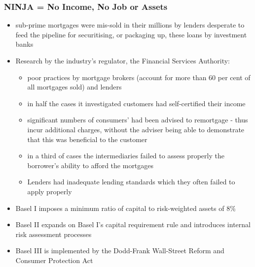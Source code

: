 \documentclass[11pt]{beamer}
\begin{document}
\begin{frame}
\frametitle{NINJA = No Income, No Job or Assets}
\begin{itemize}
\item sub-prime mortgages were mis-sold in their millions by lenders desperate to feed the pipeline for securitising, or packaging up, these loans by investment banks
\item Research by the industry's regulator, the Financial Services Authority:
\begin{itemize}
\item poor practices by mortgage brokers (account for more than 60 per cent of all mortgages sold) and lenders
\item in half the cases it investigated customers had self-certified their income
\item significant numbers of consumers' had been advised to remortgage - thus incur additional charges, without the adviser being able to demonstrate that this was beneficial to the customer
\item in a third of cases the intermediaries failed to assess properly the borrower's ability to afford the mortgages
\item Lenders had inadequate lending standards which they often failed to apply properly
\end{itemize}

\end{itemize}

\end{frame}
\begin{frame}
\begin{itemize}
\item Basel I imposes a minimum ratio of capital to risk-weighted assets of $8$\%
\item Basel II expands on Basel I's capital requirement rule and introduces internal risk assessment processes
\item Basel III is implemented by the Dodd-Frank Wall-Street Reform and Consumer Protection Act
\end{itemize}
\end{frame}
\end{document}
